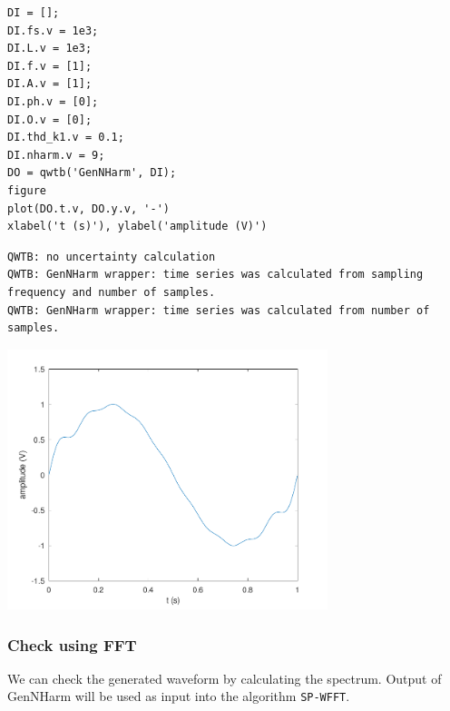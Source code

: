 \begin{lstlisting}
DI = [];
DI.fs.v = 1e3;
DI.L.v = 1e3;
DI.f.v = [1];
DI.A.v = [1];
DI.ph.v = [0];
DI.O.v = [0];
DI.thd_k1.v = 0.1;
DI.nharm.v = 9;
DO = qwtb('GenNHarm', DI);
figure
plot(DO.t.v, DO.y.v, '-')
xlabel('t (s)'), ylabel('amplitude (V)')
\end{lstlisting}
\begin{lstlisting}[language={},xleftmargin=5pt,frame=none]
QWTB: no uncertainty calculation
QWTB: GenNHarm wrapper: time series was calculated from sampling frequency and number of samples.
QWTB: GenNHarm wrapper: time series was calculated from number of samples.

\end{lstlisting}
\begin{center}
\includegraphics[width=0.7\textwidth]{algs_examples_published/GenNHarm_alg_example-3.pdf}
\end{center}


{}
\subsubsection*{Check using FFT}



We can check the generated waveform by calculating the spectrum. Output of GenNHarm will be used as input into the algorithm \texttt{SP-WFFT}.

